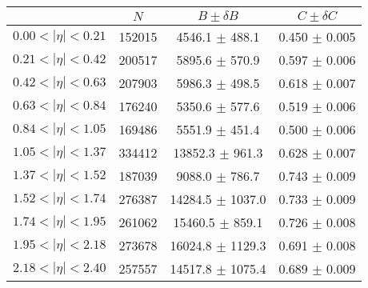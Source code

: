 \begin{tabular}{lccc}
\hline
    &   $N$   & $B \pm \delta B$  &  $C \pm \delta C$ \\
\hline
$0.00 < |\eta| <0.21$          & 152015     & 4546.1     $\pm$ 488.1 & 0.450      $\pm$ 0.005 \\
$0.21 < |\eta| <0.42$          & 200517     & 5895.6     $\pm$ 570.9 & 0.597      $\pm$ 0.006 \\
$0.42 < |\eta| <0.63$          & 207903     & 5986.3     $\pm$ 498.5 & 0.618      $\pm$ 0.007 \\
$0.63 < |\eta| <0.84$          & 176240     & 5350.6     $\pm$ 577.6 & 0.519      $\pm$ 0.006 \\
$0.84 < |\eta| <1.05$          & 169486     & 5551.9     $\pm$ 451.4 & 0.500      $\pm$ 0.006 \\
$1.05 < |\eta| <1.37$          & 334412     & 13852.3    $\pm$ 961.3 & 0.628      $\pm$ 0.007 \\
$1.37 < |\eta| <1.52$          & 187039     & 9088.0     $\pm$ 786.7 & 0.743      $\pm$ 0.009 \\
$1.52 < |\eta| <1.74$          & 276387     & 14284.5    $\pm$ 1037.0 & 0.733      $\pm$ 0.009 \\
$1.74 < |\eta| <1.95$          & 261062     & 15460.5    $\pm$ 859.1 & 0.726      $\pm$ 0.008 \\
$1.95 < |\eta| <2.18$          & 273678     & 16024.8    $\pm$ 1129.3 & 0.691      $\pm$ 0.008 \\
$2.18 < |\eta| <2.40$          & 257557     & 14517.8    $\pm$ 1075.4 & 0.689      $\pm$ 0.009 \\
\hline
\end{tabular}
